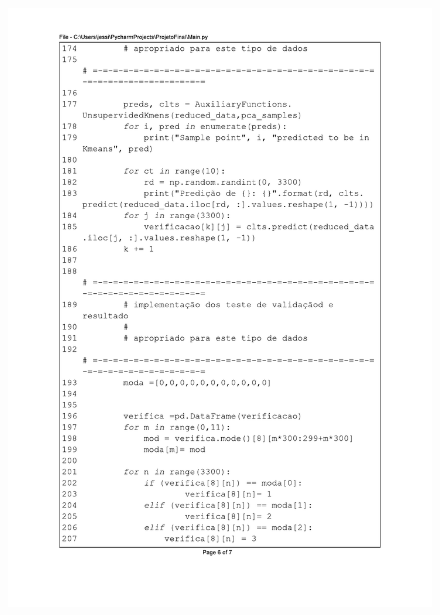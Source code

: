 \begin{figure}[H]
\centering
\includegraphics[scale=0.9]{01_Pre_textuais/code/main6.pdf}
\end{figure}
